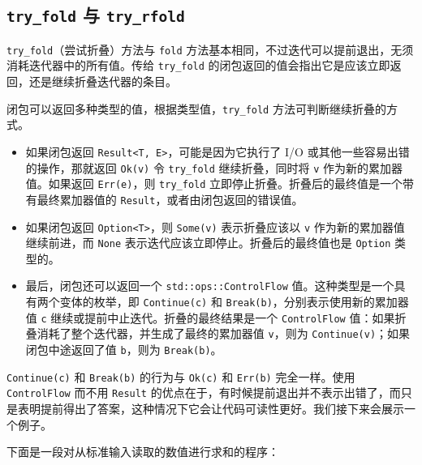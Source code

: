 \subsection{\texttt{try\_fold} 与 \texttt{try\_rfold}}

\texttt{try\_fold}（尝试折叠）方法与 \texttt{fold} 方法基本相同，不过迭代可以提前退出，无须消耗迭代器中的所有值。传给 \texttt{try\_fold} 的闭包返回的值会指出它是应该立即返回，还是继续折叠迭代器的条目。

闭包可以返回多种类型的值，根据类型值，\texttt{try\_fold} 方法可判断继续折叠的方式。

\begin{itemize}
\item 如果闭包返回 \texttt{Result<T, E>}，可能是因为它执行了 I/O 或其他一些容易出错的操作，那就返回 \texttt{Ok(v)} 令 \texttt{try\_fold} 继续折叠，同时将 \texttt{v} 作为新的累加器值。如果返回 \texttt{Err(e)}，则 \texttt{try\_fold} 立即停止折叠。折叠后的最终值是一个带有最终累加器值的 \texttt{Result}，或者由闭包返回的错误值。
\item 如果闭包返回 \texttt{Option<T>}，则 \texttt{Some(v)} 表示折叠应该以 \texttt{v} 作为新的累加器值继续前进，而 \texttt{None} 表示迭代应该立即停止。折叠后的最终值也是 \texttt{Option} 类型的。
\item 最后，闭包还可以返回一个 \texttt{std::ops::ControlFlow} 值。这种类型是一个具有两个变体的枚举，即 \texttt{Continue(c)} 和 \texttt{Break(b)}，分别表示使用新的累加器值 \texttt{c} 继续或提前中止迭代。折叠的最终结果是一个 \texttt{ControlFlow} 值：如果折叠消耗了整个迭代器，并生成了最终的累加器值 \texttt{v}，则为 \texttt{Continue(v)}；如果闭包中途返回了值 \texttt{b}，则为 \texttt{Break(b)}。
\end{itemize}

\texttt{Continue(c)} 和 \texttt{Break(b)} 的行为与 \texttt{Ok(c)} 和 \texttt{Err(b)} 完全一样。使用 \texttt{ControlFlow} 而不用 \texttt{Result} 的优点在于，有时候提前退出并不表示出错了，而只是表明提前得出了答案，这种情况下它会让代码可读性更好。我们接下来会展示一个例子。

下面是一段对从标准输入读取的数值进行求和的程序：

